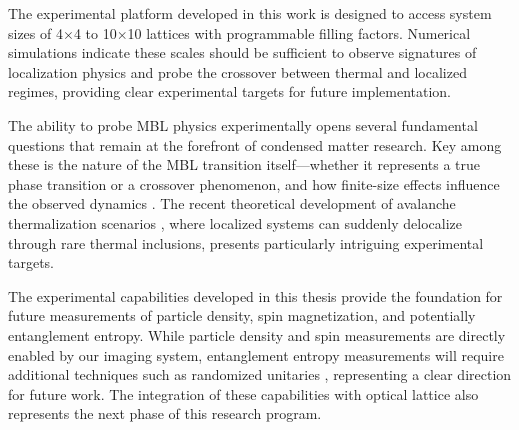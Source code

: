 The experimental platform developed in this work is designed to access system sizes of 4$\times$4 to 10$\times$10 lattices with programmable filling factors. Numerical simulations indicate these scales should be sufficient to observe signatures of localization physics and probe the crossover between thermal and localized regimes, providing clear experimental targets for future implementation.

The ability to probe MBL physics experimentally opens several fundamental questions that remain at the forefront of condensed matter research. Key among these is the nature of the MBL transition itself—whether it represents a true phase transition or a crossover phenomenon, and how finite-size effects influence the observed dynamics \cite{maceira_thermalization_2025}. The recent theoretical development of avalanche thermalization scenarios \cite{sajid_thermal_2025,ha_many-body_2023}, where localized systems can suddenly delocalize through rare thermal inclusions, presents particularly intriguing experimental targets. 


The experimental capabilities developed in this thesis provide the foundation for future measurements of particle density, spin magnetization, and potentially entanglement entropy. While particle density and spin measurements are directly enabled by our imaging system, entanglement entropy measurements will require additional techniques such as randomized unitaries \cite{elben_statistical_2019}, representing a clear direction for future work. 
The integration of these capabilities with optical lattice also represents the next phase of this research program.




